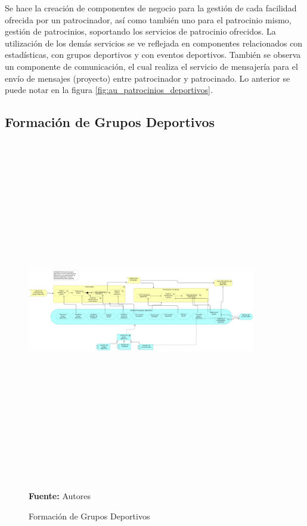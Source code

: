Se hace la creación de componentes de negocio para la gestión de cada facilidad ofrecida por un patrocinador, así como también uno para el patrocinio mismo, gestión de patrocinios, soportando los servicios de patrocinio ofrecidos. La utilización de los demás servicios se ve reflejada en componentes relacionados con estadísticas, con grupos deportivos y con eventos deportivos. También se observa un componente de comunicación, el cual realiza el servicio de mensajería para el envío de mensajes (proyecto) entre patrocinador y patrocinado. Lo anterior se puede notar en la figura \ref{fig:au_patrocinios_deportivos}.

\subsection{Formación de Grupos Deportivos}

\begin{figure}[!htb]
  \begin{center}
    \includegraphics[angle=90,width=10cm,height=15cm]{./imagenes/Archimate/vistas/application_usage/formaciongruposdeportivos.png}
    \caption{Formación de Grupos Deportivos}
    \label{fig:au_formacion_grupos_deportivos}
    \textbf{Fuente:}  Autores \\
  \end{center}
\end{figure}

